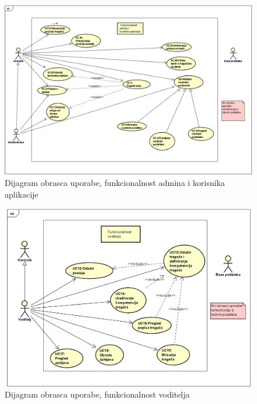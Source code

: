 					
				
				\begin{figure}[H]
					\includegraphics[width=\textwidth]{slike/Dijagram_obrasca_uporabe_funkcionalnost_admina_i_korisnika_aplikacije.PNG} %
					\caption{Dijagram obrasca uporabe, funkcionalnost admina i korisnika aplikacije}
					\label{fig:Dijagram_obrasca_uporabe_funkcionalnost_admina_i_korisnika_aplikacije} %
				\end{figure}
				
				
				\begin{figure}[H]
					\includegraphics[width=\textwidth]{slike/Dijagram_obrasca_uporabe_funkcionalnost_voditelja.PNG} %
					\caption{Dijagram obrasca uporabe, funkcionalnost voditelja}
					\label{fig:Dijagram_obrasca_uporabe_funkcionalnost_voditelja} %
				\end{figure}
				
